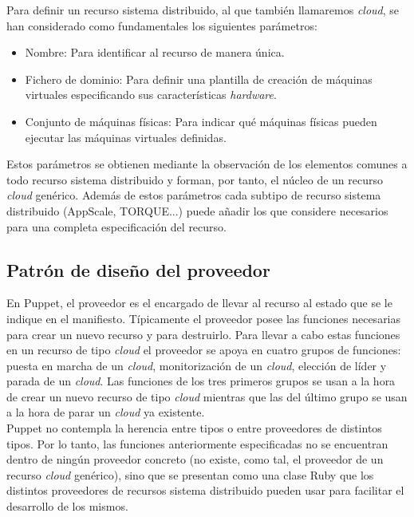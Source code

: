 Para definir un recurso sistema distribuido, al que también llamaremos \emph{cloud}, se han considerado como fundamentales los siguientes parámetros:

\begin{itemize}
\item Nombre: Para identificar al recurso de manera única.
\item Fichero de dominio: Para definir una plantilla de creación de máquinas virtuales especificando sus características \emph{hardware}.
\item Conjunto de máquinas físicas: Para indicar qué máquinas físicas pueden ejecutar las máquinas virtuales definidas.
\end{itemize}

Estos parámetros se obtienen mediante la observación de los elementos comunes a todo recurso sistema distribuido y forman, por tanto, el núcleo de un recurso \emph{cloud} genérico. Además de estos parámetros cada subtipo de recurso sistema distribuido (AppScale, TORQUE...) puede añadir los que considere necesarios para una completa especificación del recurso.


\subsection{Patrón de diseño del proveedor}
\label{sec:modelado-proveedor}

En Puppet, el proveedor es el encargado de llevar al recurso al estado que se le indique en el manifiesto. Típicamente el proveedor posee las funciones necesarias para crear un nuevo recurso y para destruirlo. Para llevar a cabo estas funciones en un recurso de tipo \emph{cloud} el proveedor se apoya en cuatro grupos de funciones: puesta en marcha de un \emph{cloud}, monitorización de un \emph{cloud}, elección de líder y parada de un \emph{cloud}. Las funciones de los tres primeros grupos se usan a la hora de crear un nuevo recurso de tipo \emph{cloud} mientras que las del último grupo se usan a la hora de parar un \emph{cloud} ya existente. \\

Puppet no contempla la herencia entre tipos o entre proveedores de distintos tipos. Por lo tanto, las funciones anteriormente especificadas no se encuentran dentro de ningún proveedor concreto (no existe, como tal, el proveedor de un recurso \emph{cloud} genérico), sino que se presentan como una clase Ruby que los distintos proveedores de recursos sistema distribuido pueden usar para facilitar el desarrollo de los mismos. \\

